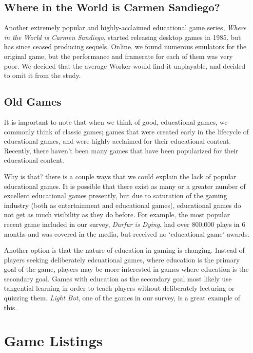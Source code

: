 \documentclass[12pt]{report}
\begin{document}
		\subsection{Where in the World is Carmen Sandiego?}
			Another extremely popular and highly-acclaimed educational game series, \textit{Where in the World is Carmen Sandiego}, started releasing desktop games in 1985, but has since ceased producing sequels. Online, we found numerous emulators for the original game, but the performance and framerate for each of them was very poor. We decided that the average Worker would find it unplayable, and decided to omit it from the study.

		\subsection{Old Games}
			It is important to note that when we think of good, educational games, we commonly think of classic games; games that were created early in the lifecycle of educational games, and were highly acclaimed for their educational content. Recently, there haven't been many games that have been popularized for their educational content.

			Why is that? there is a couple ways that we could explain the lack of popular educational games. It is possible that there exist as many or a greater number of excellent educational games presently, but due to saturation of the gaming industry (both as entertainment and educational games), educational games do not get as much visibility as they do before. For example, the most popular recent game included in our survey, \textit{Darfur is Dying}, had over 800,000 plays in 6 months and was covered in the media, but received no `educational game' awards.

			Another option is that the nature of education in gaming is changing. Instead of players seeking deliberately edcuational games, where education is the primary goal of the game, players may be more interested in games where education is the secondary goal. Games with education as the secondary goal most likely use tangential learning in order to teach players without deliberately lecturing or quizzing them. \textit{Light Bot}, one of the games in our survey, is a great example of this.
	\section{Game Listings}


\end{document}
